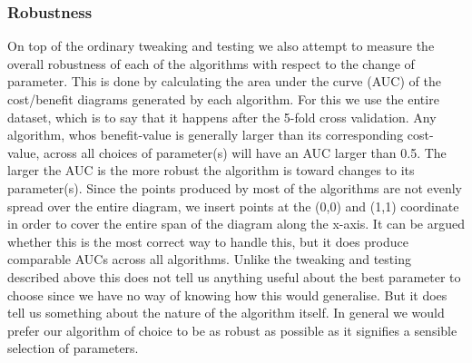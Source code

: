 \documentclass[12pt]{article}
\begin{document}
\subsubsection{Robustness} \label{sec:robustness}
%
On top of the ordinary tweaking and testing we also attempt to measure the overall robustness of each of the algorithms with respect to the change of parameter. This is done by calculating the area under the curve (AUC) of the cost/benefit diagrams generated by each algorithm. For this we use the entire dataset, which is to say that it happens after the 5-fold cross validation. Any algorithm, whos benefit-value is generally larger than its corresponding cost-value, across all choices of parameter(s) will have an AUC larger than 0.5. The larger the AUC is the more robust the algorithm is toward changes to its parameter(s). Since the points produced by most of the algorithms are not evenly spread over the entire diagram, we insert points at the (0,0) and (1,1) coordinate in order to cover the entire span of the diagram along the x-axis. It can be argued whether this is the most correct way to handle this, but it does produce comparable AUCs across all algorithms. Unlike the tweaking and testing described above this does not tell us anything useful about the best parameter to choose since we have no way of knowing how this would generalise. But it does tell us something about the nature of the algorithm itself. In general we would prefer our algorithm of choice to be as robust as possible as it signifies a sensible selection of parameters. 
%
\end{document}
